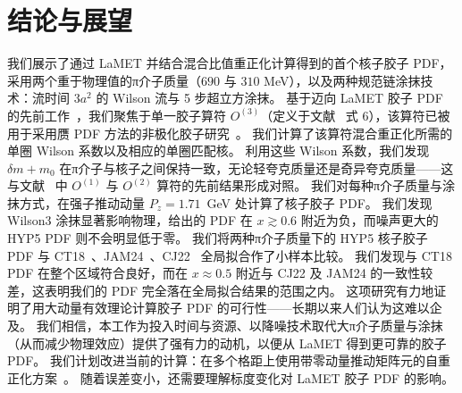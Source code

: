 \section{结论与展望}
\label{sec:conclusion}

我们展示了通过 LaMET 并结合混合比值重正化计算得到的首个核子胶子 PDF，采用两个重于物理值的π介子质量（$690$ 与 $310$ MeV），以及两种规范链涂抹技术：流时间 $3a^2$ 的 Wilson 流与 5 步超立方涂抹。
基于迈向 LaMET 胶子 PDF 的先前工作~\cite{Good:2024iur}，我们聚焦于单一胶子算符 $O^{(3)}$（定义于文献~\cite{Good:2024iur} 式 6），该算符已被用于采用赝 PDF 方法的非极化胶子研究~\cite{Fan:2020cpa,Fan:2021bcr,HadStruc:2021wmh,Salas-Chavira:2021wui,Fan:2022kcb,Delmar:2023agv,Good:2023ecp}。
我们计算了该算符混合重正化所需的单圈 Wilson 系数以及相应的单圈匹配核。
利用这些 Wilson 系数，我们发现 $\delta m+m_0$ 在π介子与核子之间保持一致，无论轻夸克质量还是奇异夸克质量——这与文献~\cite{Good:2024iur} 中 $O^{(1)}$ 与 $O^{(2)}$ 算符的先前结果形成对照。
我们对每种π介子质量与涂抹方式，在强子推动动量 $P_z = 1.71$~GeV 处计算了核子胶子 PDF。
我们发现 Wilson3 涂抹显著影响物理，给出的 PDF 在 $x \gtrsim 0.6$ 附近为负，而噪声更大的 HYP5 PDF 则不会明显低于零。
我们将两种π介子质量下的 HYP5 核子胶子 PDF 与 CT18~\cite{Hou:2019efy}、JAM24~\cite{Anderson:2024evk}、CJ22~\cite{Cerutti:2025yji} 全局拟合作了小样本比较。
我们发现与 CT18 PDF 在整个区域符合良好，而在 $x\approx 0.5$ 附近与 CJ22 及 JAM24 的一致性较差，这表明我们的 PDF 完全落在全局拟合结果的范围之内。
这项研究有力地证明了用大动量有效理论计算胶子 PDF 的可行性——长期以来人们认为这难以企及。
我们相信，本工作为投入时间与资源、以降噪技术取代大π介子质量与涂抹（从而减少物理效应）提供了强有力的动机，以便从 LaMET 得到更可靠的胶子 PDF。
我们计划改进当前的计算：在多个格距上使用带零动量推动矩阵元的自重正化方案~\cite{LatticePartonLPC:2021gpi}。
随着误差变小，还需要理解标度变化对 LaMET 胶子 PDF 的影响。
